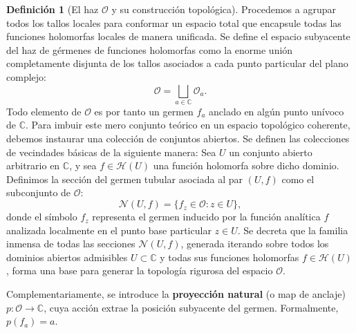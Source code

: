 \documentclass[11pt,a4paper]{article}
\theoremstyle{definition}
\newtheorem{definicion}{Definición}[section]
\theoremstyle{remark}
\numberwithin{equation}{section}
\begin{document}
\begin{definicion}[El haz $\mathcal{O}$ y su construcción topológica]
Procedemos a agrupar todos los tallos locales para conformar un espacio total que encapsule todas las funciones holomorfas locales de manera unificada. Se define el espacio subyacente del haz de gérmenes de funciones holomorfas como la enorme unión completamente disjunta de los tallos asociados a cada punto particular del plano complejo:
\begin{equation}
\mathcal{O} = \bigsqcup_{a \in \mathbb{C}} \mathcal{O}_a.
\end{equation}
Todo elemento de $\mathcal{O}$ es por tanto un germen $f_a$ anclado en algún punto unívoco de $\mathbb{C}$.
Para imbuir este mero conjunto teórico en un espacio topológico coherente, debemos instaurar una colección de conjuntos abiertos. Se definen las colecciones de vecindades básicas de la siguiente manera:
Sea $U$ un conjunto abierto arbitrario en $\mathbb{C}$, y sea $f \in \mathcal{H}(U)$ una función holomorfa sobre dicho dominio. Definimos la sección del germen tubular asociada al par $(U, f)$ como el subconjunto de $\mathcal{O}$:
\begin{equation}
\mathcal{N}(U, f) = \{ f_z \in \mathcal{O} : z \in U \},
\end{equation}
donde el símbolo $f_z$ representa el germen inducido por la función analítica $f$ analizada localmente en el punto base particular $z \in U$.
Se decreta que la familia inmensa de todas las secciones $\mathcal{N}(U, f)$, generada iterando sobre todos los dominios abiertos admisibles $U \subset \mathbb{C}$ y todas sus funciones holomorfas $f \in \mathcal{H}(U)$, forma una base para generar la topología rigurosa del espacio $\mathcal{O}$.

Complementariamente, se introduce la \textbf{proyección natural} (o map de anclaje) $p: \mathcal{O} \to \mathbb{C}$, cuya acción extrae la posición subyacente del germen. Formalmente, $p(f_a) = a$.
\end{definicion}
\end{document}
